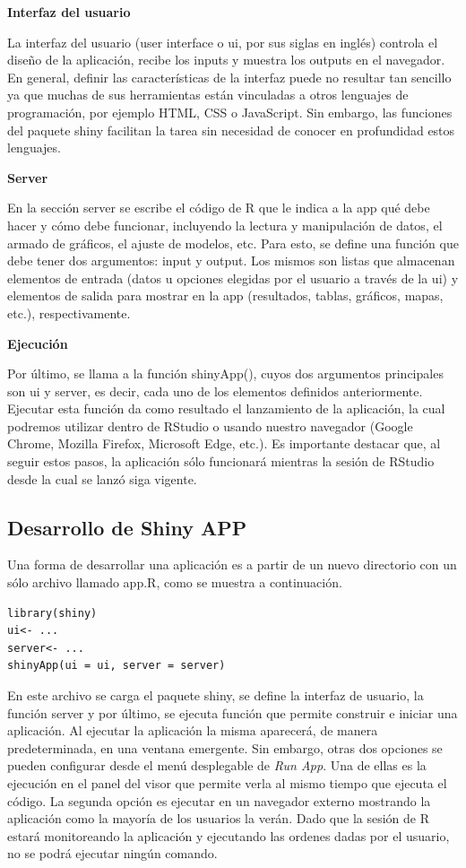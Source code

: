\textbf{Interfaz del usuario}

La interfaz del usuario (user interface o ui, por sus siglas en inglés) controla el diseño de la aplicación, recibe los inputs y muestra los outputs en el navegador. En general, definir las características de la interfaz puede no resultar tan sencillo ya que muchas de sus herramientas están vinculadas a otros lenguajes de programación, por ejemplo HTML, CSS o JavaScript. Sin embargo, las funciones del paquete shiny facilitan la tarea sin necesidad de conocer en profundidad estos lenguajes.

\textbf{Server}

En la sección server se escribe el código de R que le indica a la app qué debe hacer y cómo debe funcionar, incluyendo la lectura y manipulación de datos, el armado de gráficos, el ajuste de modelos, etc. Para esto, se define una función que debe tener dos argumentos: input y output. Los mismos son listas que almacenan elementos de entrada (datos u opciones elegidas por el usuario a través de la ui) y elementos de salida para mostrar en la app (resultados, tablas, gráficos, mapas, etc.), respectivamente.


\textbf{Ejecución}

Por último, se llama a la función shinyApp(), cuyos dos argumentos principales son ui y server, es decir, cada uno de los elementos definidos anteriormente. Ejecutar esta función da como resultado el lanzamiento de la aplicación, la cual podremos utilizar dentro de RStudio o usando nuestro navegador (Google Chrome, Mozilla Firefox, Microsoft Edge, etc.). Es importante destacar que, al seguir estos pasos, la aplicación sólo funcionará mientras la sesión de RStudio desde la cual se lanzó siga vigente.


\subsection{Desarrollo de Shiny APP}

Una forma de desarrollar una  aplicación es a partir de un nuevo directorio con un sólo archivo llamado app.R, como se muestra a continuación. 

\begin{lstlisting}
library(shiny)
ui<- ...
server<- ...
shinyApp(ui = ui, server = server)
\end{lstlisting}

En este archivo se carga el paquete shiny, se define la interfaz de usuario, la función server y por último, se ejecuta función que permite construir e iniciar una aplicación. Al ejecutar la aplicación la misma aparecerá, de manera predeterminada, en una ventana emergente. Sin embargo, otras dos opciones se pueden configurar desde el menú desplegable de \emph{Run App}. Una de ellas es la ejecución en el panel del visor que permite verla al mismo tiempo que ejecuta el código. La segunda opción es ejecutar en un navegador externo mostrando la aplicación como la mayoría de los usuarios la verán. Dado que la sesión de R estará monitoreando la aplicación y ejecutando las ordenes dadas por el usuario, no se podrá ejecutar ningún comando.

